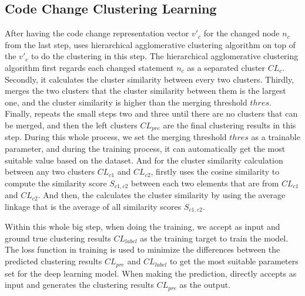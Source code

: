 
\subsection{Code Change Clustering Learning}

After having the code change representation vector $v'_c$ for the changed node $n_c$ from the last step, \tool uses hierarchical agglomerative clustering algorithm on top of the $v'_c$ to do the clustering in this step. The hierarchical agglomerative clustering algorithm first regards each changed statement $n_c$ as a separated cluster $CL_c$. Secondly, it calculates the cluster similarity between every two clusters. Thirdly, \tool merges the two clusters that the cluster similarity between them is the largest one, and the cluster similarity is higher than the merging threshold $thres$. Finally, \tool repeats the small steps two and three until there are no clusters that can be merged, and then the left clusters $CL_{pre}$ are the final clustering results in this step. During this whole process, we set the merging threshold $thres$ as a trainable parameter, and during the training process, it can automatically get the most suitable value based on the dataset. And for the cluster similarity calculation between any two clusters $CL_{c1}$ and $CL_{c2}$, \tool firstly uses the cosine similarity to compute the similarity score $S_{c1,c2}$ between each two elements that are from $CL_{c1}$ and $CL_{c2}$. And then, the \tool calculates the cluster similarity by using the average linkage that is the average of all similarity scores $S_{c1,c2}$.

Within this whole big step, when doing the training, we accept {\mvpdg} as input and ground true clustering results $CL_{label}$ as the training target to train the model. The loss function in training is used to minimize the differences between the predicted clustering results $CL_{pre}$ and $CL_{label}$ to get the most suitable parameters set for the deep learning model. When making the prediction, \tool directly accepts {\mvpdg} as input and generates the clustering results $CL_{pre}$ as the output.
